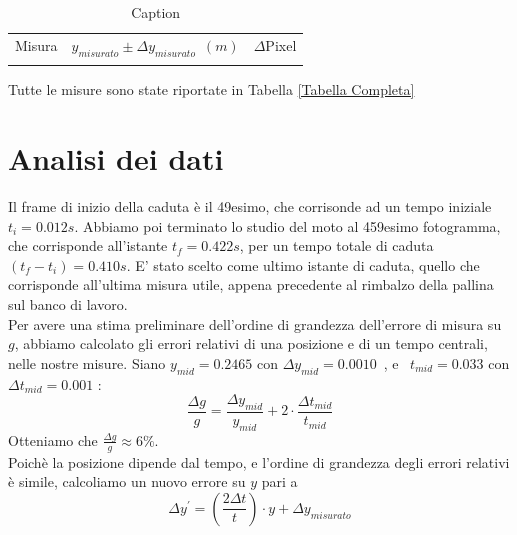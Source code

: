 \documentclass[12pt, a4paper]{article}
\begin{document}
\begin{table}[!h]
    \centering
    \begin{tabular}{|c|c|c|}
    \hline
    \multirow{2}{*}{\small Misura} 
    &\multirow{2}{*}{\small$y_{misurato}\pm\Delta y_{misurato}$\ $(m)$} 
    &\multirow{2}{*}{\small $\Delta$Pixel} 
    \\
    && 
    \\
    \hline
    \hline
       &  & \\
    \hline
    \end{tabular}
        \caption{Caption}
        \label{tab:my_label}
\end{table}

\bigskip
Tutte le misure sono state riportate in Tabella \ref{Tabella Completa}




\section{Analisi dei dati}
Il frame di inizio della caduta è il 49esimo, che corrisonde ad un tempo iniziale \textit{$t_i = 0.012s$}.
Abbiamo poi terminato lo studio del moto al 459esimo fotogramma, che corrisponde all'istante \textit{$t_f = 0.422s$}, per un tempo totale di caduta \textit{$(t_f-t_i) = 0.410s$}. 
E' stato scelto come ultimo istante di caduta, quello che corrisponde all'ultima misura utile, appena precedente al rimbalzo della pallina sul banco di lavoro.\\

Per avere una stima preliminare dell'ordine di grandezza dell'errore di misura su $g$, abbiamo calcolato gli errori relativi di una posizione e di un tempo centrali, nelle nostre misure. Siano $y_{mid}=0.2465$ con $\Delta y_{mid}=0.0010$\ , e \ $t_{mid}=0.033$ con $\Delta t_{mid}=0.001$ :
\begin{equation*}
    \frac{\Delta g}{g}=\frac{\Delta y_{mid}}{y_{mid}}+2\cdot \frac{\Delta t_{mid}}{t_{mid}}
\end{equation*}
Otteniamo che $\displaystyle\frac{\Delta g}{g}\approx 6\%$.\bigskip\\

Poichè la posizione dipende dal tempo, e l'ordine di grandezza degli errori relativi è simile, calcoliamo un nuovo errore su $y$ pari a 
\begin{equation*}
   \Delta y^{'} = \left(\frac{2\Delta t}{t}\right)\cdot y + \Delta y_{misurato}
\end{equation*}
\end{document}

